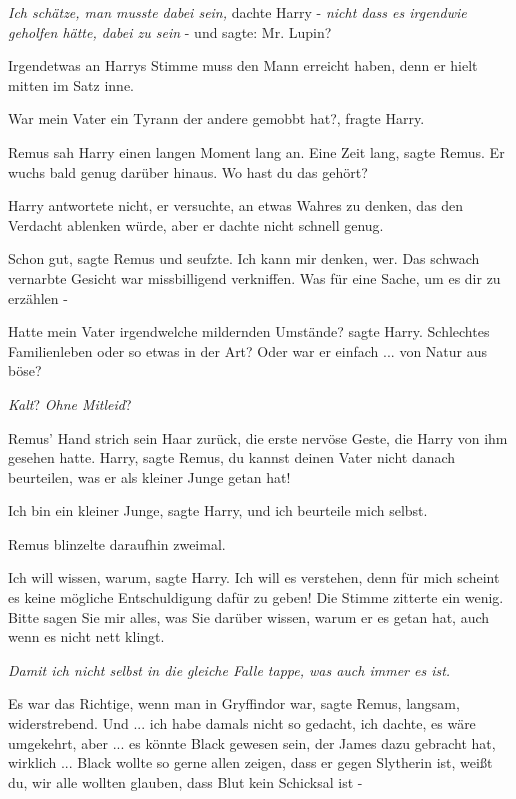 \emph{Ich schätze, man musste dabei sein,} dachte Harry - \emph{nicht dass es
irgendwie geholfen hätte, dabei zu sein} - und sagte: \glqq{}Mr. Lupin?\grqq{}

Irgendetwas an Harrys Stimme muss den Mann erreicht haben, denn er hielt mitten
im Satz inne.

\glqq{}War mein Vater ein Tyrann der andere gemobbt hat?\grqq{}, fragte Harry.

Remus sah Harry einen langen Moment lang an. \glqq{}Eine Zeit lang\grqq{}, sagte
Remus. \glqq{}Er wuchs bald genug darüber hinaus. Wo hast du das gehört?\grqq{}

Harry antwortete nicht, er versuchte, an etwas Wahres zu denken, das den
Verdacht ablenken würde, aber er dachte nicht schnell genug.

\glqq{}Schon gut\grqq{}, sagte Remus und seufzte. \glqq{}Ich kann mir denken,
wer.\grqq{} Das schwach vernarbte Gesicht war missbilligend verkniffen. \glqq{}Was für
eine Sache, um es dir zu erzählen -\grqq{}

\glqq{}Hatte mein Vater irgendwelche mildernden Umstände?\grqq{} sagte Harry.
\glqq{}Schlechtes Familienleben oder so etwas in der Art? Oder war er einfach ...
von Natur aus böse?\grqq{}

\emph{Kalt}? \emph{Ohne Mitleid}?

Remus' Hand strich sein Haar zurück, die erste nervöse Geste, die Harry von ihm
gesehen hatte. \glqq{}Harry\grqq{}, sagte Remus, \glqq{}du kannst deinen Vater
nicht danach beurteilen, was er als kleiner Junge getan hat!\grqq{}

\glqq{}Ich bin ein kleiner Junge\grqq{}, sagte Harry, \glqq{}und ich beurteile
mich selbst.\grqq{}

Remus blinzelte daraufhin zweimal.

\glqq{}Ich will wissen, warum\grqq{}, sagte Harry. \glqq{}Ich will es verstehen,
denn für mich scheint es keine mögliche Entschuldigung dafür zu geben!\grqq{} Die
Stimme zitterte ein wenig. \glqq{}Bitte sagen Sie mir alles, was Sie darüber
wissen, warum er es getan hat, auch wenn es nicht nett klingt.\grqq{}

\emph{Damit ich nicht selbst in die gleiche Falle tappe, was auch immer es ist.}

\glqq{}Es war das Richtige, wenn man in Gryffindor war\grqq{}, sagte Remus,
langsam, widerstrebend. \glqq{}Und ... ich habe damals nicht so gedacht, ich
dachte, es wäre umgekehrt, aber ... es könnte Black gewesen sein, der James dazu
gebracht hat, wirklich ... Black wollte so gerne allen zeigen, dass er gegen
Slytherin ist, weißt du, wir alle wollten glauben, dass Blut kein Schicksal ist
-\grqq{}

